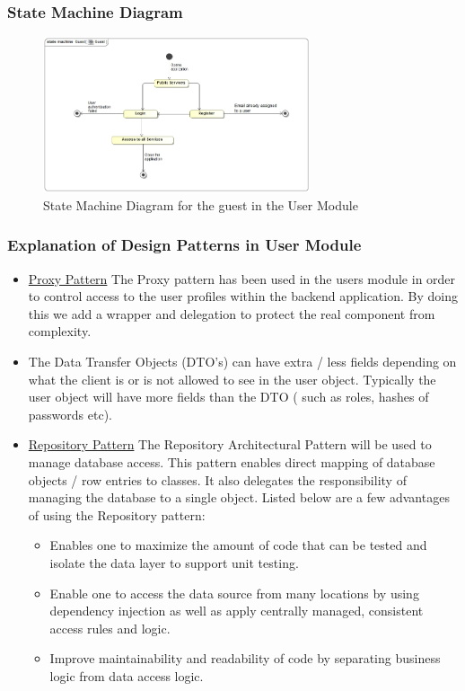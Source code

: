 \documentclass[runningheads,a4paper]{article}
\begin{document}
\subsubsection{State Machine Diagram}
\begin{figure}[H]
   	\centering
   	\includegraphics[width=0.7\textwidth]{Images/Diagrams/User Module/Guest_State_Diagram.jpg}
   	\caption{State Machine Diagram for the guest in the User Module}
\end{figure}

\subsubsection {Explanation of Design Patterns in User Module}
\begin{itemize}
\item \underline{Proxy Pattern} The Proxy pattern has been used in the users module in order to control access to the user profiles within the backend application. By doing this we add a wrapper and delegation to protect the real component from complexity. 

\item The Data Transfer Objects (DTO's)  can have extra / less fields depending on what the client is or is not allowed to see in the user object. Typically the user object will have more fields than the DTO ( such as roles, hashes of passwords etc). 

\item \underline{Repository Pattern} The Repository Architectural Pattern will be used to manage database access. This pattern enables direct mapping of database objects / row entries to classes. It also delegates the responsibility of managing the database to a single object. Listed below are a few advantages of using the Repository pattern:
	\begin{itemize}
		\item Enables one to maximize the amount of code that can be tested and isolate the data layer to support unit testing. 
		\item Enable one to access the data source from many locations by using dependency injection as well as apply centrally managed, consistent access rules and logic.
		\item Improve maintainability and readability of code by separating business logic from data access logic.  
	\end{itemize} 
\end{itemize}
\end{document}

